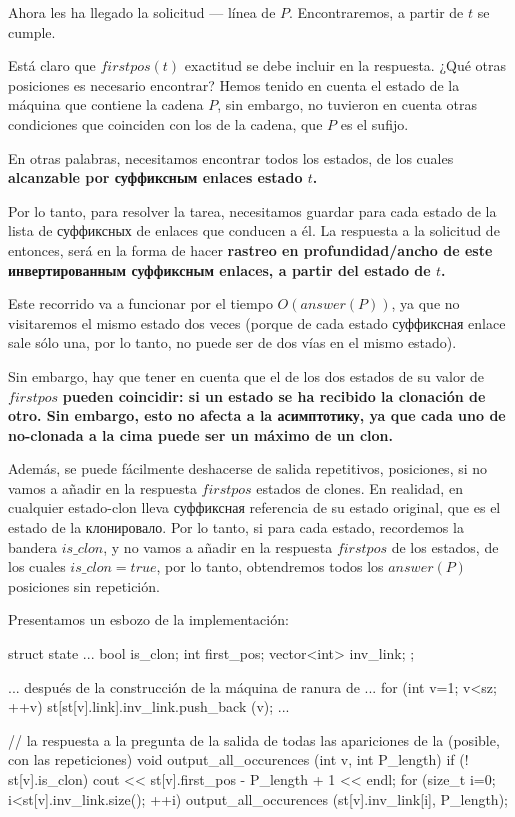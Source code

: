 Ahora les ha llegado la solicitud --- línea de $P$. Encontraremos, a partir de $t$ se cumple.

Está claro que $firstpos(t)$ exactitud se debe incluir en la respuesta. ¿Qué otras posiciones es necesario encontrar? Hemos tenido en cuenta el estado de la máquina que contiene la cadena $P$, sin embargo, no tuvieron en cuenta otras condiciones que coinciden con los de la cadena, que $P$ es el sufijo.

En otras palabras, necesitamos encontrar todos los estados, de los cuales \bf{alcanzable por суффиксным enlaces} estado $t$.

Por lo tanto, para resolver la tarea, necesitamos guardar para cada estado de la lista de суффиксных de enlaces que conducen a él. La respuesta a la solicitud de entonces, será en la forma de hacer \bf{rastreo en profundidad/ancho} de este инвертированным суффиксным enlaces, a partir del estado de $t$.

Este recorrido va a funcionar por el tiempo $O (answer (P))$, ya que no visitaremos el mismo estado dos veces (porque de cada estado суффиксная enlace sale sólo una, por lo tanto, no puede ser de dos vías en el mismo estado).

Sin embargo, hay que tener en cuenta que el de los dos estados de su valor de $firstpos$ \bf{pueden coincidir}: si un estado se ha recibido la clonación de otro. Sin embargo, esto no afecta a la асимптотику, ya que cada uno de no-clonada a la cima puede ser un máximo de un clon.

Además, se puede fácilmente deshacerse de salida repetitivos, posiciones, si no vamos a añadir en la respuesta $firstpos$ estados de clones. En realidad, en cualquier estado-clon lleva суффиксная referencia de su estado original, que es el estado de la клонировало. Por lo tanto, si para cada estado, recordemos la bandera $is\_clon$, y no vamos a añadir en la respuesta $firstpos$ de los estados, de los cuales $is\_clon = true$, por lo tanto, obtendremos todos los $answer (P)$ posiciones sin repetición.

Presentamos un esbozo de la implementación:

\code
struct state {
...
bool is_clon;
int first_pos;
vector<int> inv_link;
};


... después de la construcción de la máquina de ranura de ...
for (int v=1; v<sz; ++v)
st[st[v].link].inv_link.push_back (v);
...


// la respuesta a la pregunta de la salida de todas las apariciones de la (posible, con las repeticiones)
void output_all_occurences (int v, int P_length) {
if (! st[v].is_clon)
cout << st[v].first_pos - P_length + 1 << endl;
for (size_t i=0; i<st[v].inv_link.size(); ++i)
output_all_occurences (st[v].inv_link[i], P_length);
}
\endcode


